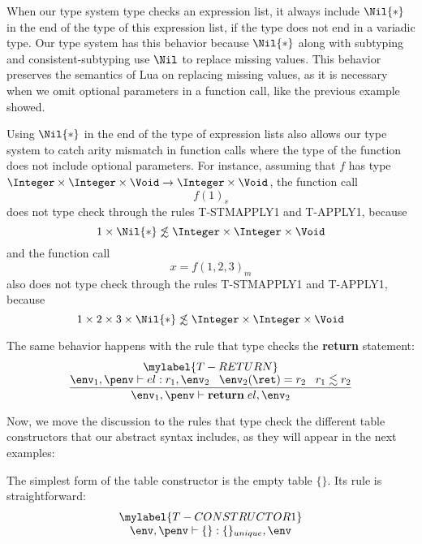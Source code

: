 When our type system type checks an expression list,
it always include $\Nil{*}$ in the end of the type of this expression list,
if the type does not end in a variadic type.
Our type system has this behavior because $\Nil{*}$ along with subtyping
and consistent-subtyping use $\Nil$ to replace missing values.
This behavior preserves the semantics of Lua on replacing missing values,
as it is necessary when we omit optional parameters in a function call,
like the previous example showed.

Using $\Nil{*}$ in the end of the type of expression lists also allows
our type system to catch arity mismatch in function calls where
the type of the function does not include optional parameters.
For instance, assuming that $f$ has type
$\Integer \times \Integer \times \Void \rightarrow \Integer \times \Void$,
the function call
\[
f(1)_{s}
\]
does not type check through the rules \textsc{T-STMAPPLY1} and \textsc{T-APPLY1}, because
\[
1 \times \Nil{*} \not\lesssim \Integer \times \Integer \times \Void
\]
and the function call
\[
x = f(1,2,3)_{m}
\]
also does not type check through the rules \textsc{T-STMAPPLY1} and \textsc{T-APPLY1}, because
\[
1 \times 2 \times 3 \times \Nil{*} \not\lesssim \Integer \times \Integer \times \Void
\]

The same behavior happens with the rule that type checks the \textbf{return}
statement:
\[
\begin{array}{c}
\mylabel{T-RETURN}\\
\dfrac{\env_{1}, \penv \vdash el:r_{1}, \env_{2} \;\;\;
       \env_{2}(\ret) = r_{2} \;\;\;
       r_{1} \lesssim r_{2}}
      {\env_{1}, \penv \vdash \mathbf{return} \; el,\env_{2}}
\end{array}
\]

Now, we move the discussion to the rules that type check the
different table constructors that our abstract syntax includes,
as they will appear in the next examples:

The simplest form of the table constructor is the empty table $\{\}$.
Its rule is straightforward:
\[
\begin{array}{c}
\mylabel{T-CONSTRUCTOR1}\\
\env, \penv \vdash \{\}:\{\}_{unique}, \env
\end{array}
\]

